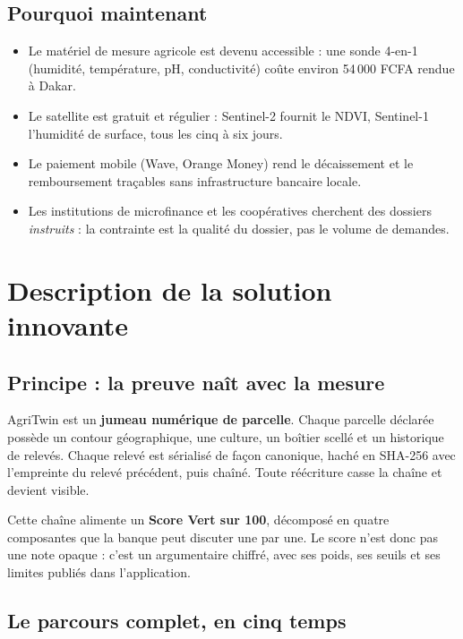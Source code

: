 \documentclass[12pt, a4paper]{article}
\begin{document}
\subsection{Pourquoi maintenant}

\begin{itemize}
  \item Le matériel de mesure agricole est devenu accessible : une sonde 4-en-1
        (humidité, température, pH, conductivité) coûte environ 54\,000 FCFA rendue à Dakar.
  \item Le satellite est gratuit et régulier : Sentinel-2 fournit le NDVI, Sentinel-1
        l'humidité de surface, tous les cinq à six jours.
  \item Le paiement mobile (Wave, Orange Money) rend le décaissement et le remboursement
        traçables sans infrastructure bancaire locale.
  \item Les institutions de microfinance et les coopératives cherchent des dossiers
        \emph{instruits} : la contrainte est la qualité du dossier, pas le volume de demandes.
\end{itemize}

\newpage
\section{Description de la solution innovante}

\subsection{Principe : la preuve naît avec la mesure}

AgriTwin est un \textbf{jumeau numérique de parcelle}. Chaque parcelle déclarée possède un
contour géographique, une culture, un boîtier scellé et un historique de relevés. Chaque
relevé est sérialisé de façon canonique, haché en SHA-256 avec l'empreinte du relevé
précédent, puis chaîné. Toute réécriture casse la chaîne et devient visible.

Cette chaîne alimente un \textbf{Score Vert sur 100}, décomposé en quatre composantes que
la banque peut discuter une par une. Le score n'est donc pas une note opaque : c'est un
argumentaire chiffré, avec ses poids, ses seuils et ses limites publiés dans l'application.

\subsection{Le parcours complet, en cinq temps}
\end{document}
